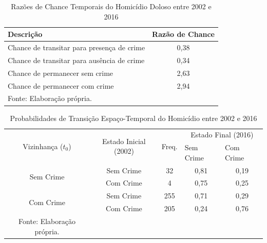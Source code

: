 \documentclass[12pt,openright,oneside,a4paper,english,french,spanish]{abntex2}
\numberwithin{table}{section} %
\numberwithin{figure}{section} %
\begin{document}
\begin{subappendices}
\begin{table}[H]
\centering
\caption{Razões de Chance Temporais do Homicídio Doloso entre 2002 e 2016}
        \begin{tabular}{lc}
            \hline
            {\textbf{Descrição}} & {\textbf{Razão de Chance}} \\\hline
            {Chance de transitar para presença de crime} & {0,38} \\
            {Chance de transitar para ausência de crime} & {0,34} \\
            {Chance de permanecer sem crime} & {2,63} \\
            {Chance de permanecer com crime} & {2,94} \\\hline
            \tiny Fonte: Elaboração própria.
        \end{tabular}
    \label{tab:odds_tempo_hom_dol_2002_2016}
\end{table}


\begin{table}[H]
\centering
\caption{Probabilidades de Transição Espaço-Temporal do Homicídio entre 2002 e 2016}
        \begin{tabular}{ccccc}
            \hline
            \multirow{2}{*}{Vizinhança ($t_0$)} & \multirow{2}{*}{Estado Inicial (2002)} & \multirow{2}{*}{Freq.} & \multicolumn{2}{c}{Estado Final (2016)}  \\\cline{4-5} %
                                        & & & \multicolumn{1}{l}{Sem Crime} & \multicolumn{1}{l}{Com Crime} \\\hline
            \multirow{2}{*}{Sem Crime} & {Sem Crime} & 32 &  {0,81} & {0,19} \\
                                       & {Com Crime} & 4 &   {0,75} & {0,25} \\\hline
            \multirow{2}{*}{Com Crime} & {Sem Crime} & 255 & {0,71} & {0,29} \\
                                       & {Com Crime} & 205 & {0,24} & {0,76} \\\hline
            \tiny Fonte: Elaboração própria.
        \end{tabular}
    \label{tab:prob_espaco_tempo_hom_dol_2002_2016}
\end{table}



\end{subappendices}
\end{document}
